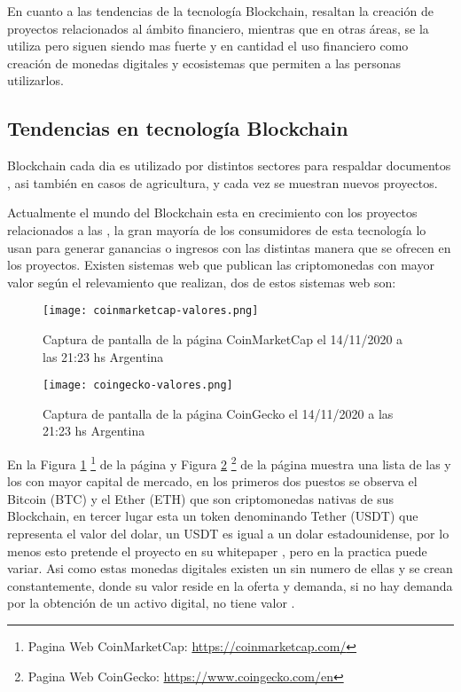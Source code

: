 En cuanto a las tendencias de la tecnología Blockchain, resaltan 
la creación de proyectos relacionados al ámbito financiero, mientras que en otras áreas, 
se la utiliza pero siguen siendo mas fuerte y en cantidad el uso financiero como creación
de monedas digitales y ecosistemas que permiten a las personas utilizarlos.  

\subsection{Tendencias en tecnología  Blockchain }
 Blockchain  cada dia es utilizado por distintos sectores para respaldar 
documentos , asi también en casos de agricultura, y cada vez se muestran nuevos proyectos. 

Actualmente el mundo del  Blockchain esta en crecimiento con los proyectos relacionados a las
, la gran mayoría de los consumidores de esta tecnología lo usan para generar 
ganancias o ingresos con las distintas manera que se ofrecen en los proyectos.
Existen sistemas web que publican las criptomonedas con mayor valor según el relevamiento que realizan, 
dos de estos sistemas web son:

\begin{figure}[hbt!]
    \centering
    {\texttt{[image: coinmarketcap-valores.png]}}
    \caption{Captura de pantalla de la  página CoinMarketCap el 14/11/2020 a las 21:23 hs Argentina} 
    \label{img:coinmarketcap-valores}
\end{figure}

\begin{figure}[hbt!]
    \centering
    {\texttt{[image: coingecko-valores.png]}}
    \caption{Captura de pantalla de la  página CoinGecko el 14/11/2020 a las 21:23 hs Argentina} 
    \label{img:coingecko-valores}
\end{figure}

En la  Figura \ref{img:coinmarketcap-valores} \footnote{Pagina Web CoinMarketCap: \url{https://coinmarketcap.com/}}  
de la página \pageref{img:coinmarketcap-valores} y 
Figura \ref{img:coingecko-valores}   \footnote{Pagina Web CoinGecko: \url{https://www.coingecko.com/en}}
de la página \pageref{img:coingecko-valores}  
muestra una lista de las  y los  con mayor capital de mercado,
en los primeros dos puestos se observa el Bitcoin (BTC) y el Ether (ETH) que son criptomonedas nativas de sus Blockchain, 
en tercer lugar esta un token denominando Tether (USDT) que representa el valor del dolar, un USDT es igual a 
un dolar estadounidense, por lo menos esto pretende el proyecto en su whitepaper \cite[]{tether_tether_2016}, pero en la practica puede variar.
Asi como estas monedas digitales existen un sin numero de ellas y se crean constantemente, donde su valor reside en la oferta y demanda,
si no hay demanda por la obtención de un activo digital, no tiene valor \cite[]{joaquin_lopez_lerida_economiBlockchain_2016}.


